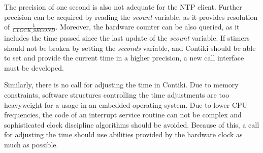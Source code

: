 The precision of one second is also not adequate for the NTP client.
Further precision can be acquired by reading the {\it{scount}} variable,
as it provides resolution of $\frac{1}{CLOCK\_SECOND}$.
Moreover, the hardware counter can be also queried, as it includes the time passed since
the last update of the {\it{scount}} variable.
If stimers should not be broken by setting the {\it{seconds}} variable,
and Contiki should be able to set and provide the current time in a higher precision,
a new call interface must be developed.

Similarly, there is no call for adjusting the time in Contiki.
Due to memory constraints, software structures controlling the time adjustments are too heavyweight
for a usage in an embedded operating system.
Due to lower CPU frequencies, the code of an interrupt service routine can not be complex
and sophisticated clock discipline algorithms should be avoided.
Because of this, a call for adjusting the time should use abilities
provided by the hardware clock as much as possible.
